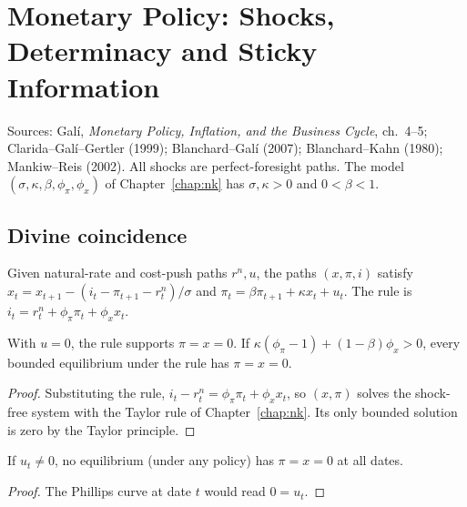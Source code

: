 \chapter{Monetary Policy: Shocks, Determinacy and Sticky Information}
\label{chap:nk_policy}

Sources: Gal\'i, \emph{Monetary Policy, Inflation, and the Business Cycle}, ch.~4--5; Clarida--Gal\'i--Gertler
(1999); Blanchard--Gal\'i (2007); Blanchard--Kahn (1980); Mankiw--Reis (2002). All shocks are perfect-foresight
paths. The model $(\sigma,\kappa,\beta,\phi_\pi,\phi_x)$ of Chapter~\ref{chap:nk} has $\sigma,\kappa>0$ and
$0<\beta<1$.

\section{Divine coincidence}

\begin{definition}
\label{def:nk_shock_eq}
\leanok
Given natural-rate and cost-push paths $r^n, u$, the paths $(x,\pi,i)$ satisfy
$x_t = x_{t+1} - (i_t - \pi_{t+1} - r^n_t)/\sigma$ and $\pi_t = \beta\pi_{t+1} + \kappa x_t + u_t$. The rule is
$i_t = r^n_t + \phi_\pi\pi_t + \phi_x x_t$.
\end{definition}

\begin{theorem}
\label{thm:nk_divine}
\leanok
{}
With $u = 0$, the rule supports $\pi = x = 0$. If $\kappa(\phi_\pi - 1) + (1-\beta)\phi_x > 0$, every bounded
equilibrium under the rule has $\pi = x = 0$.
\end{theorem}
\begin{proof}
\leanok
Substituting the rule, $i_t - r^n_t = \phi_\pi\pi_t + \phi_x x_t$, so $(x,\pi)$ solves the shock-free system with
the Taylor rule of Chapter~\ref{chap:nk}. Its only bounded solution is zero by the Taylor principle.
\end{proof}

\begin{theorem}
\label{thm:nk_costpush}
\leanok
{}
If $u_t \ne 0$, no equilibrium (under any policy) has $\pi = x = 0$ at all dates.
\end{theorem}
\begin{proof}
\leanok
The Phillips curve at date $t$ would read $0 = u_t$.
\end{proof}

